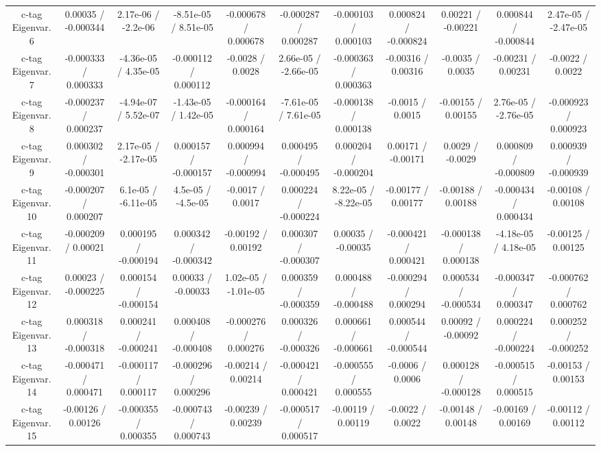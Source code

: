 \begin{table}[htbp]
\begin{center}
\begin{tabular}{|c|c|c|c|c|c|c|c|c|c|c|}
  c-tag Eigenvar. 6 & 0.00035 / -0.000344 & 2.17e-06 / -2.2e-06 & -8.51e-05 / 8.51e-05 & -0.000678 / 0.000678 & -0.000287 / 0.000287 & -0.000103 / 0.000103 & 0.000824 / -0.000824 & 0.00221 / -0.00221 & 0.000844 / -0.000844 & 2.47e-05 / -2.47e-05 \\ 
  c-tag Eigenvar. 7 & -0.000333 / 0.000333 & -4.36e-05 / 4.35e-05 & -0.000112 / 0.000112 & -0.0028 / 0.0028 & 2.66e-05 / -2.66e-05 & -0.000363 / 0.000363 & -0.00316 / 0.00316 & -0.0035 / 0.0035 & -0.00231 / 0.00231 & -0.0022 / 0.0022 \\ 
  c-tag Eigenvar. 8 & -0.000237 / 0.000237 & -4.94e-07 / 5.52e-07 & -1.43e-05 / 1.42e-05 & -0.000164 / 0.000164 & -7.61e-05 / 7.61e-05 & -0.000138 / 0.000138 & -0.0015 / 0.0015 & -0.00155 / 0.00155 & 2.76e-05 / -2.76e-05 & -0.000923 / 0.000923 \\ 
  c-tag Eigenvar. 9 & 0.000302 / -0.000301 & 2.17e-05 / -2.17e-05 & 0.000157 / -0.000157 & 0.000994 / -0.000994 & 0.000495 / -0.000495 & 0.000204 / -0.000204 & 0.00171 / -0.00171 & 0.0029 / -0.0029 & 0.000809 / -0.000809 & 0.000939 / -0.000939 \\ 
  c-tag Eigenvar. 10 & -0.000207 / 0.000207 & 6.1e-05 / -6.11e-05 & 4.5e-05 / -4.5e-05 & -0.0017 / 0.0017 & 0.000224 / -0.000224 & 8.22e-05 / -8.22e-05 & -0.00177 / 0.00177 & -0.00188 / 0.00188 & -0.000434 / 0.000434 & -0.00108 / 0.00108 \\ 
  c-tag Eigenvar. 11 & -0.000209 / 0.00021 & 0.000195 / -0.000194 & 0.000342 / -0.000342 & -0.00192 / 0.00192 & 0.000307 / -0.000307 & 0.00035 / -0.00035 & -0.000421 / 0.000421 & -0.000138 / 0.000138 & -4.18e-05 / 4.18e-05 & -0.00125 / 0.00125 \\ 
  c-tag Eigenvar. 12 & 0.00023 / -0.000225 & 0.000154 / -0.000154 & 0.00033 / -0.00033 & 1.02e-05 / -1.01e-05 & 0.000359 / -0.000359 & 0.000488 / -0.000488 & -0.000294 / 0.000294 & 0.000534 / -0.000534 & -0.000347 / 0.000347 & -0.000762 / 0.000762 \\ 
  c-tag Eigenvar. 13 & 0.000318 / -0.000318 & 0.000241 / -0.000241 & 0.000408 / -0.000408 & -0.000276 / 0.000276 & 0.000326 / -0.000326 & 0.000661 / -0.000661 & 0.000544 / -0.000544 & 0.00092 / -0.00092 & 0.000224 / -0.000224 & 0.000252 / -0.000252 \\ 
  c-tag Eigenvar. 14 & -0.000471 / 0.000471 & -0.000117 / 0.000117 & -0.000296 / 0.000296 & -0.00214 / 0.00214 & -0.000421 / 0.000421 & -0.000555 / 0.000555 & -0.0006 / 0.0006 & 0.000128 / -0.000128 & -0.000515 / 0.000515 & -0.00153 / 0.00153 \\ 
  c-tag Eigenvar. 15 & -0.00126 / 0.00126 & -0.000355 / 0.000355 & -0.000743 / 0.000743 & -0.00239 / 0.00239 & -0.000517 / 0.000517 & -0.00119 / 0.00119 & -0.0022 / 0.0022 & -0.00148 / 0.00148 & -0.00169 / 0.00169 & -0.00112 / 0.00112 \\ 

\end{tabular}
\end{center}
\end{table}
